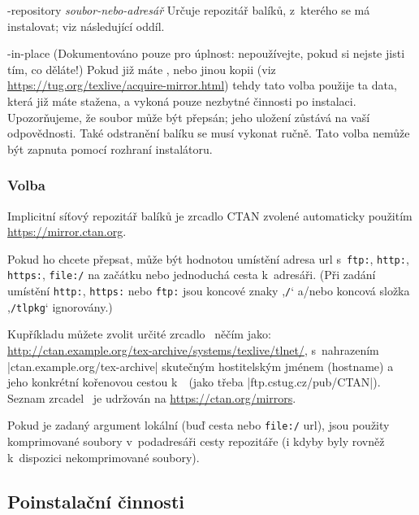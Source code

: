 \documentclass[\classoptions,slovak,english,czech]{\classname}
\newcommand{\singleuv}[1]{,#1`}
\begin{document}
\begin{ttdescription}
\item [-repository {\sl soubor-nebo-adresář}] Určuje 
  repozitář balíků, z~kterého se má instalovat; viz následující oddíl.

\item[-in-place] (Dokumentováno pouze pro úplnost: nepoužívejte, pokud
  si nejste jisti tím, co děláte!) 
  Pokud již máte ,  nebo jinou kopii \TL{} (viz
  \url{https://tug.org/texlive/acquire-mirror.html}) tehdy tato volba
  použije ta data, která již máte stažena, a vykoná pouze nezbytné činnosti
  po instalaci. Upozorňujeme, že soubor 
  může být přepsán; jeho uložení zůstává na vaší odpovědnosti. Také odstranění 
  balíku se musí vykonat ručně. Tato volba nemůže být zapnuta pomocí 
  rozhraní instalátoru.
\end{ttdescription}


\subsubsection{Volba }
\label{sec:location}

Implicitní síťový repozitář balíků je zrcadlo CTAN zvolené automaticky
použitím \url{https://mirror.ctan.org}.

Pokud ho chcete přepsat, může být hodnotou umístění 
adresa url s~\texttt{ftp:}, \texttt{http:}, \texttt{https:}, 
\texttt{file:/} na začátku nebo jednoduchá cesta k~adresáři.  
(Při zadání umístění \texttt{http:}, \texttt{https:} nebo \texttt{ftp:} 
jsou koncové znaky \singleuv{\texttt{/}} a/nebo koncová složka
 \singleuv{\texttt{/tlpkg}} ignorovány.)

Kupříkladu můžete zvolit určité zrcadlo \CTAN\ něčím 
jako: \url{http://ctan.example.org/tex-archive/systems/texlive/tlnet/},
s~nahrazením |ctan.example.org/tex-archive| skutečným 
hostitelským jménem (hostname) a jeho konkrétní kořenovou 
cestou k~\CTAN\ (jako třeba |ftp.cstug.cz/pub/CTAN|).   
Seznam zrcadel \CTAN\ je udržován na \url{https://ctan.org/mirrors}.

Pokud je zadaný argument lokální (buď cesta nebo \texttt{file:/} url),
jsou použity komprimované soubory v~podadresáři 
cesty repozitáře (i kdyby byly rovněž k~dispozici nekomprimované soubory).

\subsection{Poinstalační činnosti}
\label{sec:postinstall}
\end{document}

